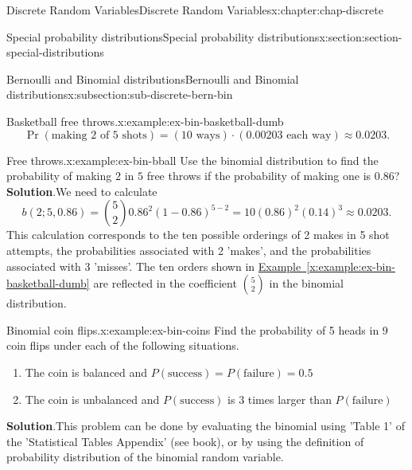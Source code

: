 \documentclass[oneside,10pt,]{book}
\newcommand{\blocktitlefont}{\relax}
\newcommand{\xreffont}{\relax}
\numberwithin{equation}{section}
\begin{document}
\begin{chapterptx}{Discrete Random Variables}{}{Discrete Random Variables}{}{}{x:chapter:chap-discrete}
\begin{sectionptx}{Special probability distributions}{}{Special probability distributions}{}{}{x:section:section-special-distributions}
\begin{subsectionptx}{Bernoulli and Binomial distributions}{}{Bernoulli and Binomial distributions}{}{}{x:subsection:sub-discrete-bern-bin}
\begin{example}{Basketball free throws.}{x:example:ex-bin-basketball-dumb}
\begin{equation*}
\operatorname{Pr}(\text{making 2 of 5 shots}) = (10 \text{ ways})\cdot(0.00203 \text{ each way}) \approx 0.0203\text{.}
\end{equation*}
%
\end{example}
\begin{example}{Free throws.}{x:example:ex-bin-bball}%
Use the binomial distribution to find the probability of making \(2\) in \(5\) free throws if the probability of making one is \(0.86\)?%
\textbf{\blocktitlefont Solution}.\quad{}We need to calculate%
\begin{equation*}
b(2; 5, 0.86) = {5\choose2}0.86^2(1-0.86)^{5-2}
= 10(0.86)^2(0.14)^3 \approx 0.0203\text{.}
\end{equation*}
This calculation corresponds to the ten possible orderings of 2 makes in 5 shot attempts, the probabilities associated with 2 'makes', and the probabilities associated with 3 'misses'.  The ten orders shown in \hyperref[x:example:ex-bin-basketball-dumb]{Example~{\xreffont\ref{x:example:ex-bin-basketball-dumb}}} are reflected in the coefficient \({5 \choose 2}\) in the binomial distribution.%
\end{example}
\begin{example}{Binomial coin flips.}{x:example:ex-bin-coins}%
Find the probability of 5 heads in 9 coin flips under each of the following situations.%
\begin{enumerate}
\item{}The coin is balanced and \(P(\text{success}) = P(\text{failure}) =
0.5\)%
\item{}The coin is unbalanced and \(P(\text{success})\) is \(3\) times larger than \(P(\text{failure})\)%
\end{enumerate}
%
\textbf{\blocktitlefont Solution}.\quad{}This problem can be done by evaluating the binomial using 'Table 1' of the 'Statistical Tables Appendix' (see book), or by using the definition of probability distribution of the binomial random variable. %
\end{example}
\end{subsectionptx}
\end{sectionptx}
\end{chapterptx}
\end{document}
